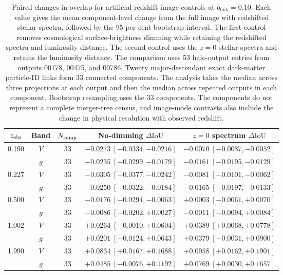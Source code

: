 \documentclass[usenatbib]{mnras}
\begin{document}
\begin{table}
\centering
\caption{Paired changes in overlap for artificial-redshift image controls at
$b_{\mathrm{link}}=0.10$. Each value gives the mean component-level change
from the full image with redshifted stellar spectra, followed by the 95 per
cent bootstrap interval. The first control removes cosmological surface-brightness
dimming while retaining the redshifted spectra and luminosity distance. The
second control uses the $z=0$ stellar spectra and retains the luminosity
distance. The comparison uses 53 halo-output entries from outputs 00178,
00475, and 00786. Twenty major-descendant exact dark-matter particle-ID links
form 33 connected components. The analysis takes the median across three
projections at each output and then the median across repeated outputs in each
component. Bootstrap resampling uses the 33 components. The components do not
represent a complete merger-tree census, and image-mode contrasts also include
the change in physical resolution with observed redshift.}
\label{tab:redshiftmodepaired}
\small
\setlength{\tabcolsep}{4pt}
\begin{tabular}{ccccc}
\toprule
$z_{\rm obs}$ & Band & $N_{\rm comp}$ & No-dimming $\Delta\mathrm{IoU}$
& $z=0$ spectrum $\Delta\mathrm{IoU}$ \\
\midrule
0.190 & $V$ & 33 & $-0.0273\;[-0.0334,-0.0216]$ & $-0.0070\;[-0.0087,-0.0052]$ \\
 & $g$ & 33 & $-0.0235\;[-0.0299,-0.0179]$ & $-0.0161\;[-0.0195,-0.0129]$ \\
0.227 & $V$ & 33 & $-0.0305\;[-0.0377,-0.0242]$ & $-0.0081\;[-0.0101,-0.0062]$ \\
 & $g$ & 33 & $-0.0250\;[-0.0322,-0.0184]$ & $-0.0165\;[-0.0197,-0.0133]$ \\
0.500 & $V$ & 33 & $-0.0176\;[-0.0294,-0.0063]$ & $+0.0003\;[-0.0061,+0.0070]$ \\
 & $g$ & 33 & $-0.0086\;[-0.0202,+0.0027]$ & $-0.0011\;[-0.0094,+0.0084]$ \\
1.002 & $V$ & 33 & $+0.0264\;[-0.0010,+0.0604]$ & $+0.0389\;[+0.0068,+0.0778]$ \\
 & $g$ & 33 & $+0.0201\;[-0.0124,+0.0643]$ & $+0.0379\;[-0.0031,+0.0900]$ \\
1.990 & $V$ & 33 & $+0.0834\;[+0.0167,+0.1688]$ & $+0.0958\;[+0.0162,+0.1901]$ \\
 & $g$ & 33 & $+0.0485\;[-0.0076,+0.1192]$ & $+0.0769\;[+0.0030,+0.1657]$ \\
\bottomrule
\end{tabular}
\end{table}
\end{document}
